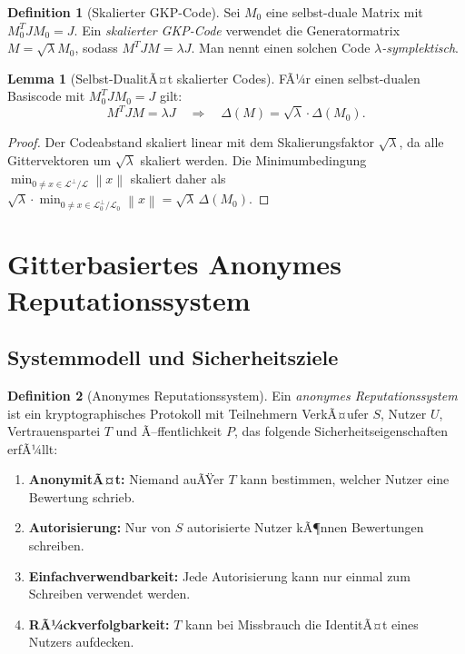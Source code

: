 ﻿\documentclass[a4paper,12pt]{article}
\theoremstyle{definition}
\newtheorem{definition}{Definition}
\newtheorem{lemma}{Lemma}
\newcommand{\Lat}{\mathcal{L}}
\newcommand{\norm}[1]{\left\|#1\right\|}
\begin{document}
\begin{definition}[Skalierter GKP-Code]
Sei $M_0$ eine selbst-duale Matrix mit $M_0^T J M_0 = J$.
Ein \emph{skalierter GKP-Code} verwendet die Generatormatrix
$M = \sqrt{\lambda} M_0$, sodass $M^T J M = \lambda J$.
Man nennt einen solchen Code \emph{$\lambda$-symplektisch}.
\end{definition}

\begin{lemma}[Selbst-DualitÃ¤t skalierter Codes]
FÃ¼r einen selbst-dualen Basiscode mit $M_0^T J M_0 = J$ gilt:
\[
    M^T J M = \lambda J \quad \Longrightarrow \quad \Delta(M) = \sqrt{\lambda} \cdot \Delta(M_0).
\]
\end{lemma}

\begin{proof}
Der Codeabstand skaliert linear mit dem Skalierungsfaktor $\sqrt{\lambda}$,
da alle Gittervektoren um $\sqrt{\lambda}$ skaliert werden.
Die Minimumbedingung $\min_{0 \neq x \in \Lat^\perp/\Lat}\norm{x}$ skaliert daher als
$\sqrt{\lambda} \cdot \min_{0 \neq x \in \Lat_0^\perp/\Lat_0}\norm{x} = \sqrt{\lambda}\,\Delta(M_0)$.
\end{proof}

\section{Gitterbasiertes Anonymes Reputationssystem}

\subsection{Systemmodell und Sicherheitsziele}

\begin{definition}[Anonymes Reputationssystem]
Ein \emph{anonymes Reputationssystem} ist ein kryptographisches Protokoll
mit Teilnehmern VerkÃ¤ufer $S$, Nutzer $U$, Vertrauenspartei $T$ und Ã–ffentlichkeit $P$,
das folgende Sicherheitseigenschaften erfÃ¼llt:
\begin{enumerate}
    \item \textbf{AnonymitÃ¤t:} Niemand auÃŸer $T$ kann bestimmen, welcher Nutzer eine Bewertung schrieb.
    \item \textbf{Autorisierung:} Nur von $S$ autorisierte Nutzer kÃ¶nnen Bewertungen schreiben.
    \item \textbf{Einfachverwendbarkeit:} Jede Autorisierung kann nur einmal zum Schreiben verwendet werden.
    \item \textbf{RÃ¼ckverfolgbarkeit:} $T$ kann bei Missbrauch die IdentitÃ¤t eines Nutzers aufdecken.
\end{enumerate}
\end{definition}
\end{document}
